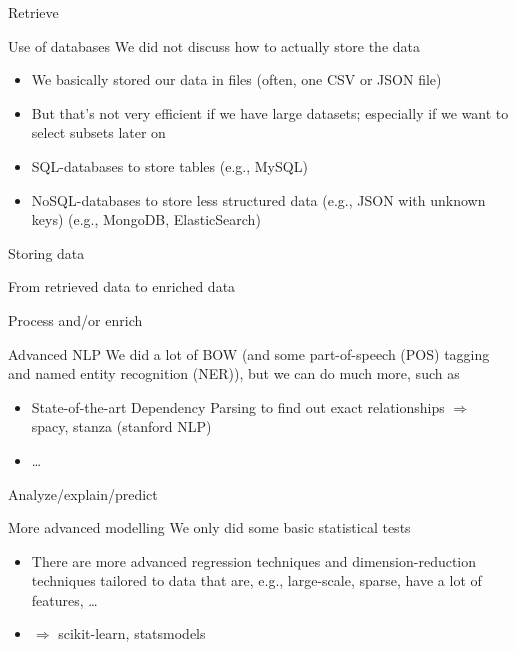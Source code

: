 \begin{frame}{Retrieve}
	\begin{block}{Use of databases \parencite{Guenther2018}}
		We did not discuss how to actually store the data
		\begin{itemize}
			\item We basically stored our data in files (often, one CSV or JSON file)
			\item But that's not very efficient if we have large datasets; especially if we want to select subsets later on
			\item SQL-databases to store tables (e.g., MySQL)
			\item NoSQL-databases to store less structured data (e.g., JSON with unknown keys) (e.g., MongoDB, ElasticSearch)
		\end{itemize}
	\end{block}
\end{frame}





\begin{frame}{Storing data}
\end{frame}




\begin{frame}{From retrieved data to enriched data}
\end{frame}

\begin{frame}{Process and/or enrich}
	\begin{block}{Advanced NLP}
        		We did a lot of BOW (and some part-of-speech (POS) tagging and named entity recognition (NER)), but we can do much more, such as 
		\begin{itemize}
			\item State-of-the-art Dependency Parsing to find out exact relationships
			$\Rightarrow$  spacy, stanza (stanford NLP)
                        \item \ldots
		\end{itemize}
	\end{block}
\end{frame}


 
\begin{frame}{Analyze/explain/predict}
	\begin{block}{More advanced modelling}
		We only did some basic statistical tests
		\begin{itemize}
			\item There are more advanced regression techniques and dimension-reduction techniques tailored to data that are, e.g., large-scale, sparse, have a lot of features, \ldots
			\item $\Rightarrow$ scikit-learn, statsmodels
		\end{itemize}
	\end{block}
\end{frame}


